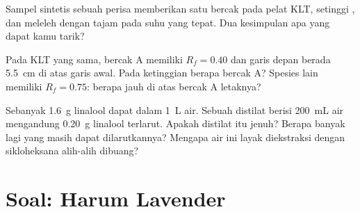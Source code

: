 \begin{exercise}[$\star\star\star$]\label{exo:g10:chemical-species:13}
Sampel sintetis sebuah perisa memberikan satu bercak pada pelat KLT,
setinggi , dan meleleh dengan tajam pada suhu yang
tepat. Dua kesimpulan apa yang dapat kamu tarik?
\end{exercise}

\begin{exercise}[$\star\star\star$]\label{exo:g10:chemical-species:14}
Pada KLT yang sama, bercak A memiliki $R_f = 0.40$ dan garis depan
berada \qty{5.5}{cm} di atas garis awal. Pada ketinggian berapa bercak A?
Spesies lain memiliki $R_f = 0.75$: berapa jauh di atas bercak A
letaknya?
\end{exercise}

\begin{exercise}[$\star\star\star$]\label{exo:g10:chemical-species:15}
Sebanyak \qty{1.6}{g} linalool dapat  dalam \qty{1}{L} air. Sebuah
distilat berisi \qty{200}{mL} air mengandung \qty{0.20}{g} linalool
terlarut. Apakah distilat itu jenuh? Berapa banyak lagi yang masih dapat
dilarutkannya? Mengapa air ini layak diekstraksi dengan sikloheksana
alih-alih dibuang?
\end{exercise}

\clearpage %
\section{Soal: Harum Lavender}

